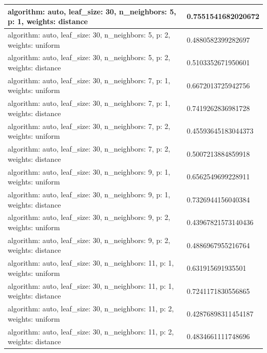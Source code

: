 \documentclass{report}
\begin{document}
{\begin{longtable}{|p{295.6px}|p{100.3px}|}
                    algorithm: auto, leaf\_size: 30, n\_neighbors: 5, p: 1, weights: distance & 0.7551541682020672 \\
                    \hline
                    algorithm: auto, leaf\_size: 30, n\_neighbors: 5, p: 2, weights: uniform & 0.4880582399282697 \\
                    \hline
                    algorithm: auto, leaf\_size: 30, n\_neighbors: 5, p: 2, weights: distance & 0.5103352671950601 \\
                    \hline
                    algorithm: auto, leaf\_size: 30, n\_neighbors: 7, p: 1, weights: uniform & 0.6672013725942756 \\
                    \hline
                    algorithm: auto, leaf\_size: 30, n\_neighbors: 7, p: 1, weights: distance & 0.7419262836981728 \\
                    \hline
                    algorithm: auto, leaf\_size: 30, n\_neighbors: 7, p: 2, weights: uniform & 0.45593645183044373 \\
                    \hline
                    algorithm: auto, leaf\_size: 30, n\_neighbors: 7, p: 2, weights: distance & 0.5007213884859918 \\
                    \hline
                    algorithm: auto, leaf\_size: 30, n\_neighbors: 9, p: 1, weights: uniform & 0.6562549699228911 \\
                    \hline
                    algorithm: auto, leaf\_size: 30, n\_neighbors: 9, p: 1, weights: distance & 0.7326944156040384 \\
                    \hline
                    algorithm: auto, leaf\_size: 30, n\_neighbors: 9, p: 2, weights: uniform & 0.43967821573140436 \\
                    \hline
                    algorithm: auto, leaf\_size: 30, n\_neighbors: 9, p: 2, weights: distance & 0.4886967955216764 \\
                    \hline
                    algorithm: auto, leaf\_size: 30, n\_neighbors: 11, p: 1, weights: uniform & 0.631915691935501 \\
                    \hline
                    algorithm: auto, leaf\_size: 30, n\_neighbors: 11, p: 1, weights: distance & 0.7241171830556865 \\
                    \hline
                    algorithm: auto, leaf\_size: 30, n\_neighbors: 11, p: 2, weights: uniform & 0.42876898311454187 \\
                    \hline
                    algorithm: auto, leaf\_size: 30, n\_neighbors: 11, p: 2, weights: distance & 0.4834661111748696 \\

\end{longtable}}
\end{document}
